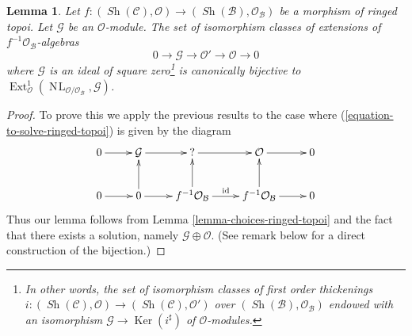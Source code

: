 \documentclass{stacks-project}
\theoremstyle{plain}
\newtheorem{lemma}[subsection]{Lemma}
\theoremstyle{definition}
\theoremstyle{remark}
\numberwithin{equation}{subsection}
\def\Ext{\mathop{\mathrm{Ext}}\nolimits}
\def\Sh{\mathop{\mathit{Sh}}\nolimits}
\def\NL{\mathop{N\!L}\nolimits}
\def\Ker{\mathop{\mathrm{Ker}}}
\begin{document}
\begin{lemma}
\label{lemma-extensions-of-relative-ringed-topoi}
Let $f : (\Sh(\mathcal{C}), \mathcal{O}) \to
(\Sh(\mathcal{B}), \mathcal{O}_\mathcal{B})$ be a morphism of
ringed topoi. Let $\mathcal{G}$ be an $\mathcal{O}$-module.
The set of isomorphism classes of extensions of
$f^{-1}\mathcal{O}_\mathcal{B}$-algebras
$$
0 \to \mathcal{G} \to \mathcal{O}' \to \mathcal{O} \to 0
$$
where $\mathcal{G}$ is an ideal of square zero\footnote{In other words,
the set of isomorphism classes of first order thickenings
$i : (\Sh(\mathcal{C}), \mathcal{O}) \to (\Sh(\mathcal{C}), \mathcal{O}')$
over $(\Sh(\mathcal{B}), \mathcal{O}_\mathcal{B})$ endowed with an isomorphism
$\mathcal{G} \to \Ker(i^\sharp)$ of $\mathcal{O}$-modules.} 
is canonically bijective to
$\Ext^1_\mathcal{O}(\NL_{\mathcal{O}/\mathcal{O}_\mathcal{B}}, \mathcal{G})$.
\end{lemma}

\begin{proof}
To prove this we apply the previous results to the case where
(\ref{equation-to-solve-ringed-topoi}) is given by the diagram
$$
\xymatrix{
0 \ar[r] &
\mathcal{G} \ar[r] &
{?} \ar[r] &
\mathcal{O} \ar[r] & 0 \\
0 \ar[r] &
0 \ar[u] \ar[r] &
f^{-1}\mathcal{O}_\mathcal{B} \ar[u] \ar[r]^{\text{id}} &
f^{-1}\mathcal{O}_\mathcal{B} \ar[u] \ar[r] & 0
}
$$
Thus our lemma follows from Lemma \ref{lemma-choices-ringed-topoi}
and the fact that there exists a solution, namely
$\mathcal{G} \oplus \mathcal{O}$.
(See remark below for a direct construction of the bijection.)
\end{proof}
\end{document}
